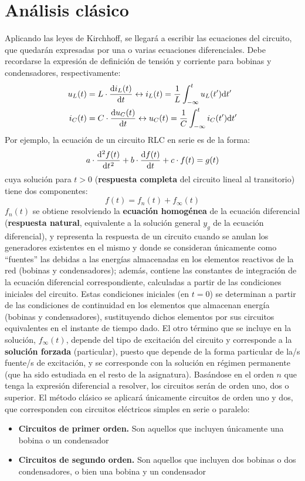 \section{Análisis clásico}
\label{sec:transitorio-clasico}


Aplicando las leyes de Kirchhoff, se
llegará a escribir las ecuaciones del circuito, que quedarán
expresadas por una o varias ecuaciones diferenciales. Debe recordarse
la expresión de definición de tensión y corriente para bobinas y
condensadores, respectivamente:
\begin{align*}
  u_L(t) &= L \cdot \diff{i_L(t)}{t}
           \leftrightarrow
           i_L(t) = \frac{1}{L} \int^t_{-\infty}u_L(t') \mathrm{d}t'\\
  i_C(t) &= C \cdot \diff{u_C(t)}{t}
           \leftrightarrow
           u_C(t) = \frac{1}{C} \int^t_{-\infty}i_C(t') \mathrm{d}t'
\end{align*}
Por ejemplo, la ecuación de un circuito RLC en serie es de la forma:
\begin{equation*}
  a \cdot \diff[2]{f(t)}{t} + b \cdot \diff{f(t)}{t} + c \cdot f(t) = g(t)
\end{equation*}
cuya solución para $t > 0$ (\textbf{respuesta completa} del circuito
lineal al transitorio) tiene dos componentes:
\begin{equation*}
  f(t) = f_n(t) + f_\infty(t)
\end{equation*}
$f_n(t)$ se obtiene resolviendo la \textbf{ecuación homogénea} de la
ecuación diferencial (\textbf{respuesta natural}, equivalente a la
solución general $y_g$ de la ecuación diferencial), y representa la
respuesta de un circuito cuando se anulan los generadores existentes
en el mismo y donde se consideran únicamente como ``fuentes'' las
debidas a las energías almacenadas en los elementos reactivos de la
red (bobinas y condensadores); además, contiene las constantes de
integración de la ecuación diferencial correspondiente, calculadas a
partir de las condiciones iniciales del circuito. Estas condiciones
iniciales (en $t=0$) se determinan a partir de las condiciones de
continuidad en los elementos que almacenan energía (bobinas y
condensadores), sustituyendo dichos elementos por sus circuitos
equivalentes en el instante de tiempo dado. El otro término que se
incluye en la solución, $f_\infty(t)$, depende del tipo de excitación
del circuito y corresponde a la \textbf{solución forzada}
(particular), puesto que depende de la forma particular de la/s
fuente/s de excitación, y se corresponde con la solución en régimen
permanente (que ha sido estudiada en el resto de la
asignatura). Basándose en el orden $n$ que tenga la expresión
diferencial a resolver, los circuitos serán de orden uno, dos o
superior. El método clásico se aplicará únicamente circuitos de orden
uno y dos, que corresponden con circuitos eléctricos simples en serie
o paralelo:
\begin{itemize}
\item \textbf{Circuitos de primer orden.} Son aquellos que incluyen
  únicamente una bobina o un condensador
\item \textbf{Circuitos de segundo orden.} Son aquellos que incluyen
  dos bobinas o dos condensadores, o bien una bobina y un condensador
\end{itemize}



